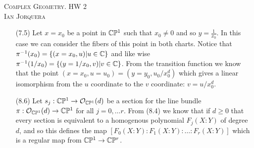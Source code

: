 \documentclass[12pt]{amsart}
\begin{document}
\begin{center}
    \textsc{Complex Geometry. HW 2\\ Ian Jorquera}
\end{center}
\vspace{1em}
\begin{itemize}
    \item[(7.5)] Let $x=x_0$ be a point in $\mathbb{C}\mathbb{P}^1$ such that $x_0\neq 0$ and so $y=\frac{1}{x_0}$. 
    In this case we can consider the fibers of this point in both charts. Notice that 
    $\pi^{-1}(x_0)=\{(x=x_0, u)|u\in \mathbb{C}\}$ and like wise $\pi^{-1}(1/x_0)=\{(y=1/x_0, v)|v\in \mathbb{C}\}$.
    From the transition function we know that the point $(x=x_0,u=u_0)=(y=y_0,u_0/x_0^{d})$ 
    which gives a linear isomorphism from the $u$ coordinate to the $v$ coordinate: $v=u/x_0^{d}$.

    \item[(8.6)] Let $s_j:\mathbb{C}\mathbb{P}^1\rightarrow\mathcal O_{\mathbb{C}\mathbb{P}^1}(d)$ be a section for the line bundle 
    $\pi:\mathcal O_{\mathbb{C}\mathbb{P}^1}(d)\rightarrow \mathbb{C}\mathbb{P}^1$ for all $j=0,\dots r$. From (8.4) we know that if $d\geq 0$ that every section 
    is equivalent to a homogenous polynomial $F_j(X:Y)$ of degree $d$, and so this defines the map
    $[F_0(X:Y):F_1(X:Y):\dots:F_r(X:Y)]$ which is a regular map from $\mathbb{C}\mathbb{P}^1\rightarrow\mathbb{C}\mathbb{P}^r$.

\end{itemize}
\end{document}
